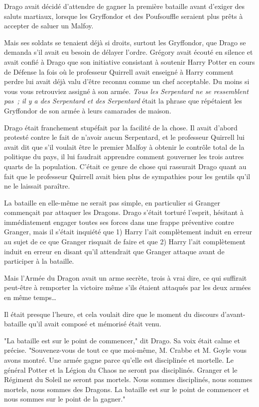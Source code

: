 Drago avait décidé d'attendre de gagner la première bataille avant d'exiger des saluts martiaux, lorsque les Gryffondor et des Poufsouffle seraient plus prêts à accepter de saluer un Malfoy.

Mais ses soldats se tenaient déjà si droits, surtout les Gryffondor, que Drago se demanda s'il avait eu besoin de délayer l'ordre. Grégory avait écouté en silence et avait confié à Drago que son initiative consistant à soutenir Harry Potter en cours de Défense la fois où le professeur Quirrell avait enseigné à Harry comment perdre lui avait déjà valu d'être reconnu comme un chef acceptable. Du moins si vous vous retrouviez assigné à son armée. \emph{Tous les Serpentard ne se ressemblent pas~; il y a des Serpentard et des Serpentard} était la phrase que répétaient les Gryffondor de son armée à leurs camarades de maison.

Drago était franchement stupéfait par la facilité de la chose. Il avait d'abord protesté contre le fait de n'avoir aucun Serpentard, et le professeur Quirrell lui avait dit que s'il voulait être le premier Malfoy à obtenir le contrôle total de la politique du pays, il lui faudrait apprendre comment gouverner les trois autres quarts de la population. C'était ce genre de chose qui rassurait Drago quant au fait que le professeur Quirrell avait bien plus de sympathies pour les gentils qu'il ne le laissait paraître.

La bataille en elle-même ne serait pas simple, en particulier si Granger commençait par attaquer les Dragons. Drago s'était torturé l'esprit, hésitant à immédiatement engager toutes ses forces dans une frappe préventive contre Granger, mais il s'était inquiété que 1) Harry l'ait complètement induit en erreur au sujet de ce que Granger risquait de faire et que 2) Harry l'ait complètement induit en erreur en disant qu'il attendrait que Granger attaque avant de participer à la bataille.

Mais l'Armée du Dragon avait un arme secrète, trois à vrai dire, ce qui suffirait peut-être à remporter la victoire même s'ils étaient attaqués par les deux armées en même temps…

Il était presque l'heure, et cela voulait dire que le moment du discours d'avant-bataille qu'il avait composé et mémorisé était venu.

"La bataille est sur le point de commencer," dit Drago. Sa voix était calme et précise. "Souvenez-vous de tout ce que moi-même, M. Crabbe et M. Goyle vous avons montré. Une armée gagne parce qu'elle est disciplinée et mortelle. Le général Potter et la Légion du Chaos ne seront pas disciplinés. Granger et le Régiment du Soleil ne seront pas mortels. Nous sommes disciplinés, nous sommes mortels, nous sommes des Dragons. La bataille est sur le point de commencer et nous sommes sur le point de la gagner."

